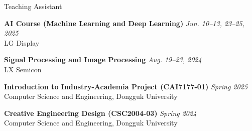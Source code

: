 \begin{rSection}{Teaching Assistant}
  \begin{samepage}
    \textbf{AI Course (Machine Learning and Deep Learning)} \hfill \emph{Jun. 10--13, 23--25, 2025} \\
    LG Display\par
  \end{samepage}

  \smallskip

  \begin{samepage}
    \textbf{Signal Processing and Image Processing} \hfill \emph{Aug. 19--23, 2024} \\
    LX Semicon\par
  \end{samepage}

  \smallskip

  \begin{samepage}
    \textbf{Introduction to Industry-Academia Project (CAI7177-01)} \hfill \emph{Spring 2025} \\
    Computer Science and Engineering, Dongguk University\par
  \end{samepage}

  \smallskip

  \begin{samepage}
    \textbf{Creative Engineering Design (CSC2004-03)} \hfill \emph{Spring 2024} \\
    Computer Science and Engineering, Dongguk University\par
  \end{samepage}
\end{rSection}
